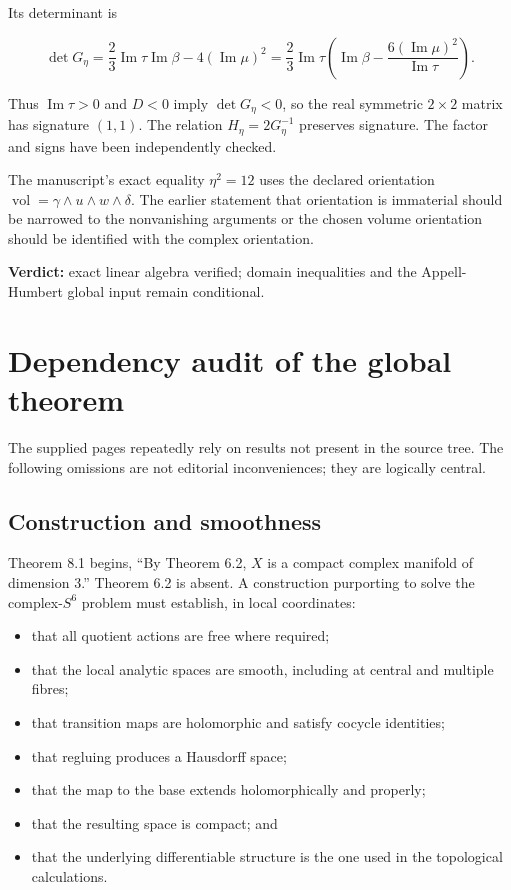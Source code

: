 \documentclass[
  10pt,
]{article}
\providecommand{\tightlist}{%
  \setlength{\itemsep}{0pt}\setlength{\parskip}{0pt}}
\begin{document}
Its determinant is

\[
\det G_\eta
=\frac23\operatorname{Im}\tau\operatorname{Im}\beta
-4(\operatorname{Im}\mu)^2
=\frac23\operatorname{Im}\tau
\left(\operatorname{Im}\beta-
\frac{6(\operatorname{Im}\mu)^2}{\operatorname{Im}\tau}\right).
\]

Thus \(\operatorname{Im}\tau>0\) and \(D<0\) imply \(\det G_\eta<0\), so
the real symmetric \(2\times2\) matrix has signature \((1,1)\). The
relation \(H_\eta=2G_\eta^{-1}\) preserves signature. The factor and
signs have been independently checked.

The manuscript's exact equality \(\eta^2=12\) uses the declared
orientation \(\operatorname{vol}=\gamma\wedge u\wedge w\wedge\delta\).
The earlier statement that orientation is immaterial should be narrowed
to the nonvanishing arguments or the chosen volume orientation should be
identified with the complex orientation.

\textbf{Verdict:} exact linear algebra verified; domain inequalities and
the Appell-Humbert global input remain conditional.

\section{Dependency audit of the global
theorem}\label{dependency-audit-of-the-global-theorem}

The supplied pages repeatedly rely on results not present in the source
tree. The following omissions are not editorial inconveniences; they are
logically central.

\subsection{Construction and
smoothness}\label{construction-and-smoothness}

Theorem 8.1 begins, ``By Theorem 6.2, \(X\) is a compact complex
manifold of dimension 3.'' Theorem 6.2 is absent. A construction
purporting to solve the complex-\(S^6\) problem must establish, in local
coordinates:

\begin{itemize}
\tightlist
\item
  that all quotient actions are free where required;
\item
  that the local analytic spaces are smooth, including at central and
  multiple fibres;
\item
  that transition maps are holomorphic and satisfy cocycle identities;
\item
  that regluing produces a Hausdorff space;
\item
  that the map to the base extends holomorphically and properly;
\item
  that the resulting space is compact; and
\item
  that the underlying differentiable structure is the one used in the
  topological calculations.
\end{itemize}
\end{document}
